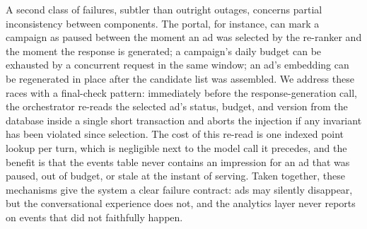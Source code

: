 A second class of failures, subtler than outright outages, concerns
partial inconsistency between components. The portal, for instance,
can mark a campaign as paused between the moment an ad was selected
by the re-ranker and the moment the response is generated; a
campaign's daily budget can be exhausted by a concurrent request in
the same window; an ad's embedding can be regenerated in place after
the candidate list was assembled. We address these races with a
final-check pattern: immediately before the response-generation
call, the orchestrator re-reads the selected ad's status, budget,
and version from the database inside a single short transaction and
aborts the injection if any invariant has been violated since
selection. The cost of this re-read is one indexed point lookup per
turn, which is negligible next to the model call it precedes, and
the benefit is that the events table never contains an impression
for an ad that was paused, out of budget, or stale at the instant
of serving. Taken together, these mechanisms give the system a
clear failure contract: ads may silently disappear, but the
conversational experience does not, and the analytics layer never
reports on events that did not faithfully happen.